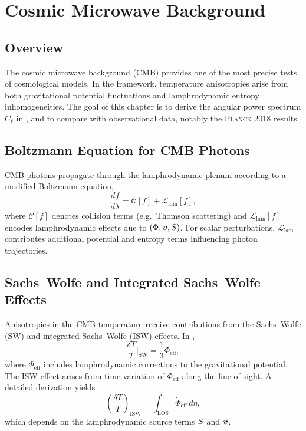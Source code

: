 
\chapter{Cosmic Microwave Background}
\label{chap:cmb}

\section{Overview}

The cosmic microwave background (CMB) provides one of the most precise tests of
cosmological models. In the \rsvpabbr{} framework, temperature anisotropies arise
from both gravitational potential fluctuations and lamphrodynamic entropy
inhomogeneities. The goal of this chapter is to derive the angular power spectrum
$C_\ell$ in \rsvpabbr{}, and to compare with observational data, notably the
\textsc{Planck} 2018 results.

\section{Boltzmann Equation for CMB Photons}

CMB photons propagate through the lamphrodynamic plenum according to a
modified Boltzmann equation,
\begin{equation}
  \label{eq:boltzmann-rsvp}
  \frac{df}{d\lambda}
   = \mathcal{C}[f] + \mathcal{L}_{\mathrm{lam}}[f],
\end{equation}
where $\mathcal{C}[f]$ denotes collision terms (e.g.\ Thomson scattering) and
$\mathcal{L}_{\mathrm{lam}}[f]$ encodes lamphrodynamic effects due to
$(\Phi,\bm{v},S)$. For scalar perturbations,
$\mathcal{L}_{\mathrm{lam}}$ contributes additional potential and entropy
terms influencing photon trajectories.

\section{Sachs--Wolfe and Integrated Sachs--Wolfe Effects}

Anisotropies in the CMB temperature receive contributions from the
Sachs--Wolfe (SW) and integrated Sachs--Wolfe (ISW) effects. In
\rsvpabbr{},
\begin{equation}
  \label{eq:sachs-wolfe-rsvp}
  \frac{\delta T}{T}\Big|_{\mathrm{SW}}
  = \frac{1}{3}\Phi_{\mathrm{eff}},
\end{equation}
where $\Phi_{\mathrm{eff}}$ includes lamphrodynamic corrections to the
gravitational potential. The ISW effect arises from time variation of
$\Phi_{\mathrm{eff}}$ along the line of sight. A detailed derivation yields
\begin{equation}
  \label{eq:isw-rsvp}
  \left(\frac{\delta T}{T}\right)_{\mathrm{ISW}}
  = \int_{\text{LOS}}\dot{\Phi}_{\mathrm{eff}}\,d\eta,
\end{equation}
which depends on the lamphrodynamic source terms $S$ and $\bm{v}$.

